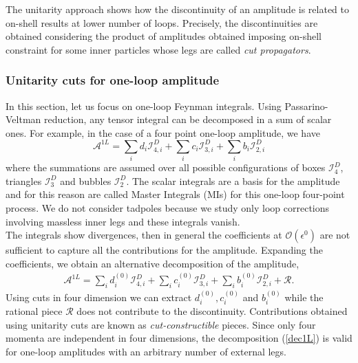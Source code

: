 The unitarity approach shows how the discontinuity of an amplitude is related to on-shell results at lower number of loops. Precisely, the discontinuities are obtained considering the product of amplitudes obtained imposing on-shell constraint for some inner particles whose legs are called \textit{cut propagators}. 
\subsubsection{Unitarity cuts for one-loop amplitude}
In this section, let us focus on one-loop Feynman integrals.
Using Passarino-Veltman reduction, any tensor integral can be decomposed in a sum of scalar ones. For example, in the case of a four point one-loop amplitude, we have
$$
	\mathcal{A}^{1L}=\sum_i d_i \mathcal{I}_{4,i}^D+\sum_i c_i \mathcal{I}_{3,i}^D+\sum_i b_i \mathcal{I}_{2,i}^D
$$
where the summations are assumed over all possible configurations of boxes $\mathcal{I}_{4}^D$, triangles $\mathcal{I}_{3}^D$ and bubbles $\mathcal{I}_{2}^D$. The scalar integrals are a basis for the amplitude and for this reason are called Master Integrals (MIs) for this one-loop four-point process. We do not consider tadpoles because we study only loop corrections involving massless inner legs and these integrals vanish.\\

The integrals show divergences, then in general the coefficients at $\mathcal{O}(\epsilon^0)$ are not sufficient to capture all the contributions for the amplitude. Expanding the coefficients, we obtain an alternative decomposition of the amplitude,
\begin{align}
	\mathcal{A}^{1L}=\sum_i d^{(0)}_i \mathcal{I}_{4,i}^D+\sum_i c^{(0)}_i \mathcal{I}_{3,i}^D+\sum_i b^{(0)}_i \mathcal{I}_{2,i}^D+\mathcal{R}.	\label{dec1L}
\end{align}
Using cuts in four dimension we can extract $d^{(0)}_i,c^{(0)}_i$ and $b^{(0)}_i$ while the rational piece $\mathcal{R}$ does not contribute to the discontinuity. Contributions obtained using unitarity cuts are known as \textit{cut-constructible} pieces. Since only four momenta are independent in four dimensions, the decomposition (\ref{dec1L}) is valid for one-loop amplitudes with an arbitrary number of external legs.
